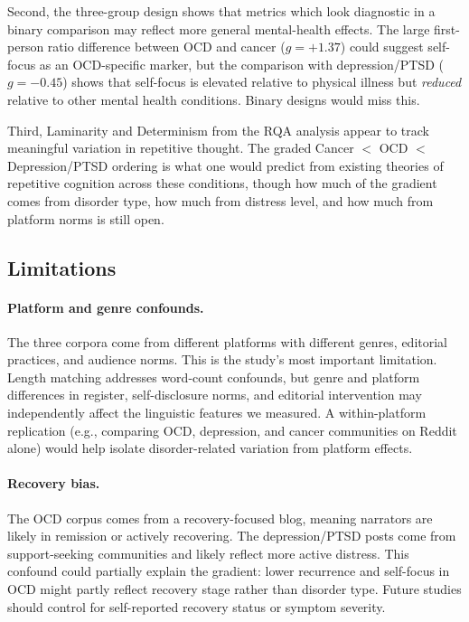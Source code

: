 \documentclass[11pt,a4paper]{article}
\begin{document}
Second, the three-group design shows that metrics which look diagnostic in a binary comparison may reflect more general mental-health effects. The large first-person ratio difference between OCD and cancer ($g = +1.37$) could suggest self-focus as an OCD-specific marker, but the comparison with depression/PTSD ($g = -0.45$) shows that self-focus is elevated relative to physical illness but \emph{reduced} relative to other mental health conditions. Binary designs would miss this.

Third, Laminarity and Determinism from the RQA analysis appear to track meaningful variation in repetitive thought. The graded Cancer $<$ OCD $<$ Depression/PTSD ordering is what one would predict from existing theories of repetitive cognition across these conditions, though how much of the gradient comes from disorder type, how much from distress level, and how much from platform norms is still open.

\subsection{Limitations}

\paragraph{Platform and genre confounds.}
The three corpora come from different platforms with different genres, editorial practices, and audience norms. This is the study's most important limitation. Length matching addresses word-count confounds, but genre and platform differences in register, self-disclosure norms, and editorial intervention may independently affect the linguistic features we measured. A within-platform replication (e.g., comparing OCD, depression, and cancer communities on Reddit alone) would help isolate disorder-related variation from platform effects.

\paragraph{Recovery bias.}
The OCD corpus comes from a recovery-focused blog, meaning narrators are likely in remission or actively recovering. The depression/PTSD posts come from support-seeking communities and likely reflect more active distress. This confound could partially explain the gradient: lower recurrence and self-focus in OCD might partly reflect recovery stage rather than disorder type. Future studies should control for self-reported recovery status or symptom severity.
\end{document}

